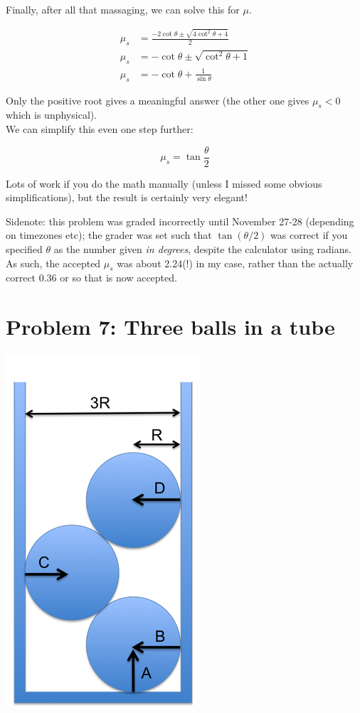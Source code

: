 \documentclass[8.01x]{subfiles}
\begin{document}
Finally, after all that massaging, we can solve this for $\mu$.

\begin{align}
\mu_s &= \frac{-2 \cot \theta \pm \sqrt{4 \cot^2 \theta + 4}}{2}\\
\mu_s &= - \cot \theta \pm \sqrt{\cot^2 \theta + 1}\\
\mu_s &= - \cot \theta + \frac{1}{\sin \theta}
\end{align}

Only the positive root gives a meaningful answer (the other one gives $\mu_s < 0$ which is unphysical).\\
We can simplify this even one step further:

\begin{equation}
\mu_s = \tan \frac{\theta}{2}
\end{equation}

Lots of work if you do the math manually (unless I missed some obvious simplifications), but the result is certainly very elegant!

Sidenote: this problem was graded incorrectly until November 27-28 (depending on timezones etc); the grader was set such that $\tan(\theta/2)$ was correct if you specified $\theta$ as the number given \emph{in degrees}, despite the calculator using radians. As such, the accepted $\mu_s$ was about 2.24(!) in my case, rather than the actually correct 0.36 or so that is now accepted.

\section{Problem 7: Three balls in a tube}

\begin{center}
\includegraphics[scale=1.0]{Graphics/h9p7}
\end{center}
\end{document}
